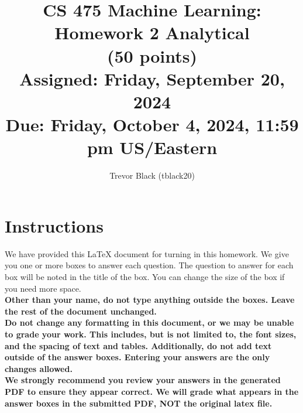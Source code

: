 \documentclass[11pt]{article}
\title{CS 475 Machine Learning: Homework 2 Analytical \\
(50 points)\\
\Large{Assigned: Friday, September 20, 2024} \\
\Large{Due: Friday, October 4, 2024, 11:59 pm US/Eastern}}
\author{Trevor Black (tblack20)}
\date{}
\renewcommand{\vec}[1]{\mathbf{#1}}
\begin{document}
\maketitle
\thispagestyle{headings}

\section*{Instructions }
We have provided this \LaTeX{} document for turning in this homework. We give you one or more boxes to answer each question.  The question to answer for each box will be noted in the title of the box.  You can change the size of the box if you need more space.\\

{\bf Other than your name, do not type anything outside the boxes. Leave the rest of the document unchanged.}\\


\textbf{Do not change any formatting in this document, or we may be unable to
  grade your work. This includes, but is not limited to, the font sizes, and the spacing of text and tables.  Additionally, do
  not add text outside of the answer boxes. Entering your answers are the only
  changes allowed.}\\


\textbf{We strongly recommend you review your answers in the generated PDF to
  ensure they appear correct. We will grade what appears in the answer boxes in
  the submitted PDF, NOT the original latex file.}

\end{document}
